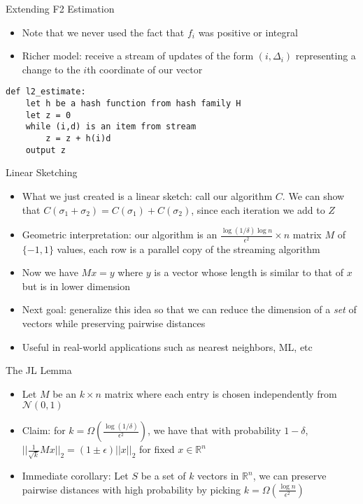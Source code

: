 \begin{frame}[fragile]{Extending F2 Estimation}
\protect\hypertarget{extending-f2-estimation}{}
\begin{itemize}
\tightlist
\item
  Note that we never used the fact that \(f_i\) was positive or integral
\item
  Richer model: receive a stream of updates of the form
  \((i, \Delta_i)\) representing a change to the \(i\)th coordinate of
  our vector
\end{itemize}

\begin{verbatim}
def l2_estimate:
    let h be a hash function from hash family H
    let z = 0
    while (i,d) is an item from stream
        z = z + h(i)d
    output z
\end{verbatim}
\end{frame}

\begin{frame}{Linear Sketching}
\protect\hypertarget{linear-sketching}{}
\begin{itemize}
\tightlist
\item
  What we just created is a linear sketch: call our algorithm \(C\). We
  can show that \(C(\sigma_1 + \sigma_2) = C(\sigma_1) + C(\sigma_2)\),
  since each iteration we add to \(Z\)
\item
  Geometric interpretation: our algorithm is an
  \(\frac{\log(1/\delta)\log n}{\epsilon^2} \times n\) matrix \(M\) of
  \(\{-1,1\}\) values, each row is a parallel copy of the streaming
  algorithm
\item
  Now we have \(Mx = y\) where \(y\) is a vector whose length is similar
  to that of \(x\) but is in lower dimension
\item
  Next goal: generalize this idea so that we can reduce the dimension of
  a \emph{set} of vectors while preserving pairwise distances
\item
  Useful in real-world applications such as nearest neighbors, ML, etc
\end{itemize}
\end{frame}

\begin{frame}{The JL Lemma}
\protect\hypertarget{the-jl-lemma}{}
\begin{itemize}
\tightlist
\item
  Let \(M\) be an \(k \times n\) matrix where each entry is chosen
  independently from \(\mathcal{N}(0,1)\)
\item
  Claim: for
  \(k = \Omega\left(\frac{\log(1/\delta)}{\epsilon^2}\right)\), we have
  that with probability \(1 - \delta\),
  \(||\frac{1}{\sqrt{k}}Mx||_2 = (1 \pm \epsilon)||x||_2\) for fixed
  \(x \in \mathbb{R}^n\)
\item
  Immediate corollary: Let \(S\) be a set of \(k\) vectors in
  \(\mathbb{R}^n\), we can preserve pairwise distances with high
  probability by picking
  \(k = \Omega\left(\frac{\log n}{\epsilon^2}\right)\)
\end{itemize}
\end{frame}

